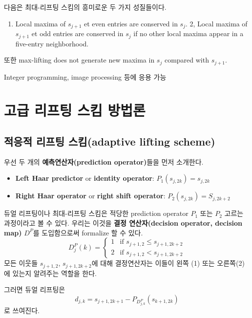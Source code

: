 \documentclass[b5paper,]{book}
\providecommand{\tightlist}{%
  \setlength{\itemsep}{0pt}\setlength{\parskip}{0pt}}
\theoremstyle{definition}
\theoremstyle{definition}
\theoremstyle{definition}
\theoremstyle{remark}
\begin{document}
다음은 최대-리프팅 스킴의 흥미로운 두 가지 성질들이다.

\begin{enumerate}
\def\labelenumi{\arabic{enumi}.}
\tightlist
\item
  Local maxima of \(s_{j+1}\) et even entries are conserved in
  \(s_{j}\). 2, Local maxima of \(s_{j+1}\) et odd entries are conserved
  in \(s_{j}\) if no other local maxima appear in a five-entry
  neighborhood.
\end{enumerate}

또한 max-lifting does not generate new maxima in \(s_{j}\) compared with
\(s_{j+1}\).

Integer programming, image processing 등에 응용 가능

\chapter{고급 리프팅 스킴 방법론}\label{advlifting}

\section{적응적 리프팅 스킴(adaptive lifting
scheme)}\label{--adaptive-lifting-scheme}

우선 두 개의 \textbf{예측연산자(prediction operator)}들을 먼저 소개한다.

\begin{itemize}
\item
  \textbf{Left Haar predictor} or \textbf{identity operator}:
  \(P_{1}(s_{j,2k})=s_{j,2k}\)
\item
  \textbf{Right Haar operator} or \textbf{right shift operator}:
  \(P_{2}(s_{j,2k})=S_{j,2k+2}\)
\end{itemize}

듀얼 리프팅이나 최대-리프팅 스킴은 적당한 prediction operator \(P_{1}\)
또는 \(P_{2}\) 고르는 과정이라고 볼 수 있다. 우리는 이것을 \textbf{결정
연산자(decision operator, decision map)} \(D^{P}\)를 도입함으로써
formalize 할 수 있다. \[D_{j}^{P}(k)=
\begin{cases}
1 & \text{if $s_{j+1,2}\leq s_{j+1,2k+2}$}\\
2 & \text{if $s_{j+1,2} < s_{j+1,2k+2}$}
\end{cases}\] 모든 이웃들 \(s_{j+1,2}\), \(s_{j+1,2k+2}\)에 대해
결정연산자는 이들이 왼쪽 (1) 또는 오른쪽(2)에 있는지 알려주는 역할을
한다.

그러면 듀얼 리프팅은
\[d_{j,k}=s_{j+1,2k+1}-P_{D_{j,k}^{P}}(s_{k+1,2k})\] 로 쓰여진다.
\end{document}
